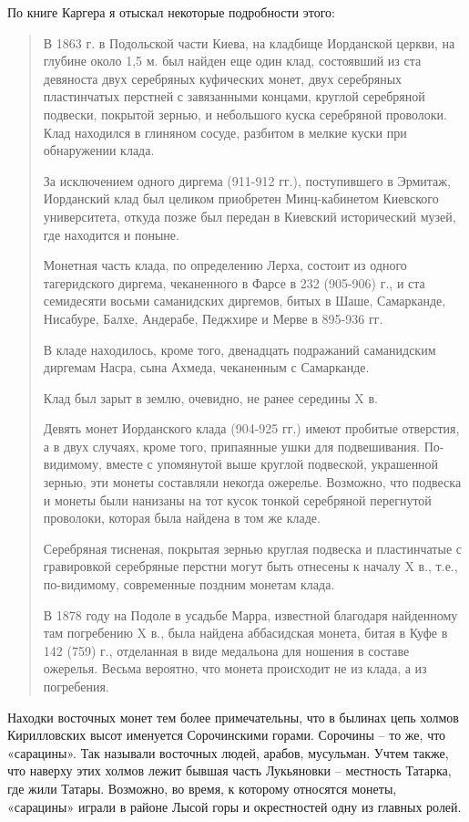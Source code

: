 По книге Каргера я отыскал некоторые подробности этого:

\begin{quotation}
В 1863 г. в Подольской части Киева, на кладбище Иорданской церкви, на глубине около 1,5 м. был найден еще один клад, состоявший из ста девяноста двух серебряных куфических монет, двух серебряных пластинчатых перстней с завязанными концами, круглой серебряной подвески, покрытой зернью, и небольшого куска серебряной проволоки. Клад находился в глиняном сосуде, разбитом в мелкие куски при обнаружении клада.

За исключением одного диргема (911-912 гг.), поступившего в Эрмитаж, Иорданский клад был целиком приобретен Минц-кабинетом Киевского университета, откуда позже был передан в Киевский исторический музей, где находится и поныне.

Монетная часть клада, по определению Лерха, состоит из одного тагеридского диргема, чеканенного в Фарсе в 232 (905-906) г., и ста семидесяти восьми саманидских диргемов, битых в Шаше, Самарканде, Нисабуре, Балхе, Андерабе, Педжхире и Мерве в 895-936 гг.

В кладе находилось, кроме того, двенадцать подражаний саманидским диргемам Насра, сына Ахмеда, чеканенным с Самарканде.

Клад был зарыт в землю, очевидно, не ранее середины X в.

Девять монет Иорданского клада (904-925 гг.) имеют пробитые отверстия, а в двух случаях, кроме того, припаянные ушки для подвешивания. По-видимому, вместе с упомянутой выше круглой подвеской, украшенной зернью, эти монеты составляли некогда ожерелье. Возможно, что подвеска и монеты были нанизаны на тот кусок тонкой серебряной перегнутой проволоки, которая была найдена в том же кладе.

Серебряная тисненая, покрытая зернью круглая подвеска и пластинчатые с гравировкой серебряные перстни могут быть отнесены к началу X в., т.е., по-видимому, современные поздним монетам клада.

В 1878 году на Подоле в усадьбе Марра, известной благодаря найденному там погребению X в., была найдена аббасидская монета, битая в Куфе в 142 (759) г., отделанная в виде медальона для ношения в составе ожерелья. Весьма вероятно, что монета происходит не из клада, а из погребения.
\end{quotation}

Находки восточных монет тем более примечательны, что в былинах цепь холмов Кирилловских высот именуется Сорочинскими горами. Сорочины – то же, что «сарацины». Так называли восточных людей, арабов, мусульман. Учтем также, что наверху этих холмов лежит бывшая часть Лукьяновки – местность Татарка, где жили Татары. Возможно, во время, к которому относятся монеты, «сарацины» играли в районе Лысой горы и окрестностей одну из главных ролей.

